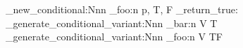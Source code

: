 \prg_new_conditional:Nnn
  \module_foo:n
  { p, T, F }
  { \prg_return_true: }
\prg_generate_conditional_variant:Nnn
  \module_bar:n  %
  { V }
  { T }
\prg_generate_conditional_variant:Nnn
  \module_foo:n  %
  { V }
  { TF }
